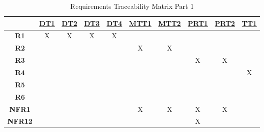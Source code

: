 \documentclass[12pt, titlepage]{article}
\begin{document}
\noindent
\begin{table}[H]
  \centering
  \begin{tabular}{|c|c|c|c|c|c|c|c|c|c|}
    \hline
                   & \hyperref[DT1]{DT1} & \hyperref[DT2]{DT2} & \hyperref[DT3]{DT3} & \hyperref[DT4]{DT4} & \hyperref[MTT1]{MTT1} & \hyperref[MTT2]{MTT2} & \hyperref[PRT1]{PRT1} & \hyperref[PRT2]{PRT2} & \hyperref[TT1]{TT1} \\
    \hline
    \textbf{R1}    & X                   & X                   & X                   & X                   &                       &                       &                       &                       &                     \\ \hline
    \textbf{R2}    &                     &                     &                     &                     & X                     & X                     &                       &                       &                     \\ \hline
    \textbf{R3}    &                     &                     &                     &                     &                       &                       & X                     & X                     &                     \\ \hline
    \textbf{R4}    &                     &                     &                     &                     &                       &                       &                       &                       & X                   \\ \hline
    \textbf{R5}    &                     &                     &                     &                     &                       &                       &                       &                       &                     \\ \hline
    \textbf{R6}    &                     &                     &                     &                     &                       &                       &                       &                       &                     \\ \hline
    \textbf{NFR1}  &                     &                     &                     &                     & X                     & X                     & X                     & X                     &                     \\ \hline
    \textbf{NFR12} &                     &                     &                     &                     &                       &                       & X                     &                       &                     \\ \hline
  \end{tabular}
  \caption{ Requirements Traceability Matrix Part 1}
  \label{Table:A_Req_trace}
\end{table}
\end{document}
